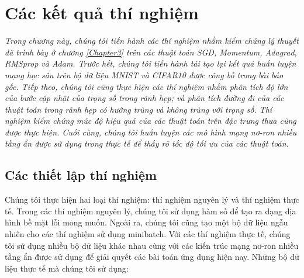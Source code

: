 \chapter{Các kết quả thí nghiệm}
\label{Chapter4}

\textit{Trong chương này, chúng tôi tiến hành các thí nghiệm nhằm kiểm chứng lý thuyết đã trình bày ở chương \ref{Chapter3} trên các thuật toán SGD, Momentum, Adagrad, RMSprop và Adam. Trước hết, chúng tôi tiến hành tái tạo lại kết quả huấn luyện mạng học sâu trên bộ dữ liệu MNIST và CIFAR10 được công bố trong bài báo gốc. Tiếp theo, chúng tôi cũng thực hiện các thí nghiệm nhằm phân tích độ lớn của bước cập nhật của trọng số trong rãnh hẹp; và phân tích đường đi của các thuật toán trong rãnh hẹp có hướng trùng và không trùng với trọng số. Thí nghiệm kiểm chứng mức độ hiệu quả của các thuật toán trên đặc trưng thưa cũng được thực hiện. Cuối cùng, chúng tôi huấn luyện các mô hình mạng nơ-ron nhiều tầng ẩn được sử dụng trong thực tế để thấy rõ tốc độ tối ưu của các thuật toán. }

\section{Các thiết lập thí nghiệm}

Chúng tôi thực hiện hai loại thí nghiệm: thí nghiệm nguyên lý và thí nghiệm thực tế. Trong các thí nghiệm nguyên lý, chúng tôi sử dụng hàm số để tạo ra dạng địa hình bề mặt lỗi mong muốn. Ngoài ra, chúng tôi cũng tạo một bộ dữ liệu ngẫu nhiên cho các thí nghiệm sử dụng minibatch. Với các thí nghiệm thực tế, chúng tôi sử dụng nhiều bộ dữ liệu khác nhau cùng với các kiến trúc mạng nơ-ron nhiều tầng ẩn được sử dụng để giải quyết các bài toán ứng dụng hiện nay. Những bộ dữ liệu thực tế mà chúng tôi sử dụng:

